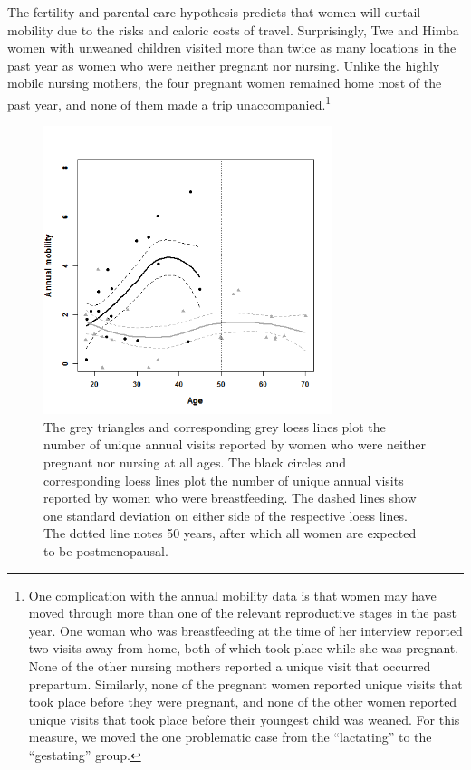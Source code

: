 The fertility and parental care hypothesis predicts that women will curtail mobility due to the risks and caloric costs of travel.  Surprisingly, Twe and Himba women with unweaned children visited more than twice as many locations in the past year as women who were neither pregnant nor nursing.  Unlike the highly mobile nursing mothers, the four pregnant women remained home most of the past year, and none of them made a trip unaccompanied.\footnote{One complication with the annual mobility data is that women may have moved through more than one of the relevant reproductive stages in the past year. One woman who was breastfeeding at the time of her interview reported two visits away from home, both of which took place while she was pregnant.  None of the other nursing mothers reported a unique visit that occurred prepartum.  Similarly, none of the pregnant women reported unique visits that took place before they were pregnant, and none of the other women reported unique visits that took place before their youngest child was weaned.  For this measure, we moved the one problematic case from the ``lactating'' to the ``gestating'' group.}


\begin{figure}[!htb]
  \includegraphics[width=0.75\textwidth]{lactmob}
\caption{The grey triangles and corresponding grey loess lines plot the number of unique annual visits reported by women who were neither pregnant nor nursing at all ages.  The black circles and corresponding loess lines plot the number of unique annual visits reported by women who were breastfeeding.  The dashed lines show one standard deviation on either side of the respective loess lines.  The dotted line notes 50 years, after which all women are expected to be postmenopausal.}
\label{fig:lactmob}       %
\end{figure}


